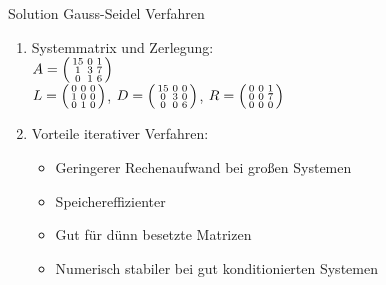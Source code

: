 \begin{KR}{Solution Gauss-Seidel Verfahren}
\begin{enumerate}
    \item Systemmatrix und Zerlegung:
    \vspace{1mm}\\
    $A = \begin{psmallmatrix}
    15 & 0 & 1\\
    1 & 3 & 7\\
    0 & 1 & 6
    \end{psmallmatrix}$
    \vspace{1mm}\\
    $L = \begin{psmallmatrix}
    0 & 0 & 0\\
    1 & 0 & 0\\
    0 & 1 & 0
    \end{psmallmatrix}$,
    $D = \begin{psmallmatrix}
    15 & 0 & 0\\
    0 & 3 & 0\\
    0 & 0 & 6
    \end{psmallmatrix}$,
    $R = \begin{psmallmatrix}
    0 & 0 & 1\\
    0 & 0 & 7\\
    0 & 0 & 0
    \end{psmallmatrix}$
    \vspace{1mm}
    \item Vorteile iterativer Verfahren:
    \begin{itemize}
        \item Geringerer Rechenaufwand bei großen Systemen
        \item Speichereffizienter
        \item Gut für dünn besetzte Matrizen
        \item Numerisch stabiler bei gut konditionierten Systemen
    \end{itemize}
\end{enumerate}
\end{KR}

